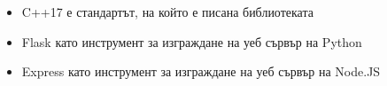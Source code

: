 \documentclass[documentation.tex]{subfiles}
\begin{document}
	\begin{itemize}
		\item C++17\cite{cpp17} е стандартът, на който е писана библиотеката
		\item Flask\cite{flask} като инструмент за изграждане на уеб сървър на Python
		\item Express\cite{express} като инструмент за изграждане на уеб сървър на Node.JS
	\end{itemize}
    
\end{document}
